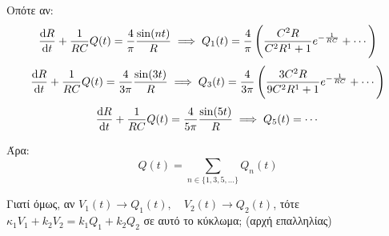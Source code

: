 \documentclass[11pt,a4paper,titlepage,draft]{article}
\begin{document}
Οπότε αν:
\[
 \frac{\dif R}{\dif t}  + \frac{1}{RC}Q(t) = \frac{4}{\pi} \frac{\sin (nt)}{R} \implies
 Q_1(t) = \frac{4}{\pi} \left( \frac{C^2R}{C^2R^1+1} e^{-\frac{1}{RC}}+ \cdots \right)
\]
\[
 \frac{\dif R}{\dif t}  + \frac{1}{RC}Q(t) = \frac{4}{3\pi} \frac{\sin (3t)}{R} \implies
 Q_3(t) = \frac{4}{3\pi} \left( \frac{3C^2R}{9C^2R^1+1} e^{-\frac{1}{RC}}+ \cdots \right)
\]
\[
 \frac{\dif R}{\dif t}  + \frac{1}{RC}Q(t) = \frac{4}{5\pi} \frac{\sin (5t)}{R} \implies
 Q_5(t) = \cdots
\]

Άρα:
\[
Q(t) = \sum_{n \in \lbrace1,3,5,\dots\rbrace}Q_n(t)
\]

Γιατί όμως, αν \(V_1(t) \rightarrow Q_1(t), \quad V_2(t) \rightarrow Q_2(t)\), τότε \(κ_1V_1+k_2V_2 = k_1Q_1 +k_2Q_2\) σε αυτό το κύκλωμα; (αρχή επαλληλίας)
\end{document}
